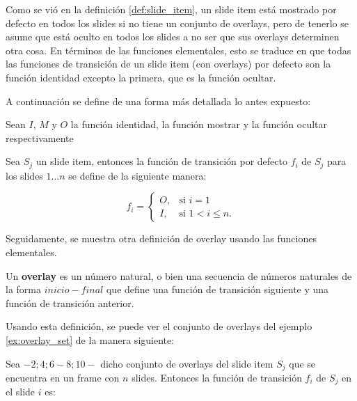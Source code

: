		Como se vió en la definición \ref{def:slide_item}, un slide item está mostrado por defecto en todos los slides si no tiene un conjunto de overlays, pero de tenerlo se asume que está oculto en todos los slides a no ser que sus overlays determinen otra cosa. En términos de las funciones elementales, esto se traduce en que todas las funciones de transición de un slide item (con overlays) por defecto son la función identidad excepto la primera, que es la función ocultar. 

		A continuación se define de una forma más detallada lo antes expuesto:

 		Sean \( I \), \( M \) y \( O \) la función identidad, la función mostrar y la función ocultar respectivamente


        Sea \( S_j \) un slide item, entonces la función de transición por defecto \( f_i \) de \( S_j \) para los slides \( 1 \dots n \) se define de la siguiente manera:


		\begin{equation}
		\label{eq:default}
			f_i = 
			\begin{cases}
				O, & \mbox{si }i = 1 \\
				I, & \mbox{si }1 < i \leq n.
			\end{cases}
		\end{equation}

		Seguidamente, se muestra otra definición de overlay usando las funciones elementales.

		\begin{definition}
		\label{def:new_overlay}

 			Un \textbf{overlay} es un número natural, o bien una secuencia de números naturales de la forma \( inicio-final \) que define una función de transición siguiente y una función de transición anterior.

		\end{definition}

		Usando esta definición, se puede ver el conjunto de overlays del ejemplo \ref{ex:overlay_set} de la manera siguiente:


		Sea \(-2; 4; 6-8; 10-\) dicho conjunto de overlays del slide item \( S_j \) que se encuentra en un frame con \( n \) slides. Entonces la función de transición \( f_i \) de \( S_j \) en el slide \( i \) es:

